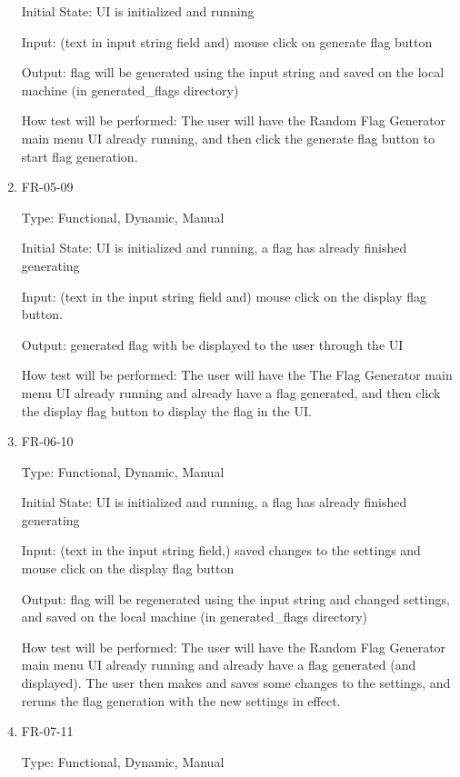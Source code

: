 \documentclass[12pt, titlepage]{article}
\begin{document}
\begin{enumerate}
Initial State: UI is initialized and running

Input: (text in input string field and) mouse click on generate flag button

Output: flag will be generated using the input string and saved on the local
machine (in \/generated\_flags directory)

How test will be performed: The user will have the Random Flag Generator main
menu UI already running, and then click the generate flag button to start flag
generation.

\item{FR-05-09\\}

Type: Functional, Dynamic, Manual

Initial State: UI is initialized and running, a flag has already finished
generating

Input: (text in the input string field and) mouse click on the display flag
button.

Output: generated flag with be displayed to the user through the UI

How test will be performed: The user will have the The Flag Generator main
menu UI already running and already have a flag generated, and then click the
display flag button to display the flag in the UI.

\item{FR-06-10\\}

Type: Functional, Dynamic, Manual

Initial State: UI is initialized and running, a flag has already finished generating

Input: (text in the input string field,) saved changes to the settings and
mouse click on the display flag button

Output: flag will be regenerated using the input string and changed settings,
and saved on the local machine (in \/generated\_flags directory)

How test will be performed: The user will have the Random Flag Generator main
menu UI already running and already have a flag generated (and displayed). The
user then makes and saves some changes to the settings, and reruns the flag
generation with the new settings in effect.

\item{FR-07-11\\}

Type: Functional, Dynamic, Manual


\end{enumerate}
\end{document}
